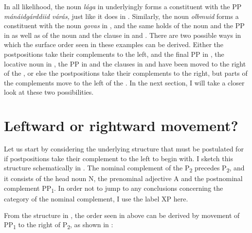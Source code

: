 \documentclass[output=paper]{LSP/langsci}
\begin{document}
In all likelihood, the noun \textit{lága} in  underlyingly forms a constituent with the PP \textit{mánáidgárddiid várás,} just like it does in . Similarly,\textit{} the noun \textit{olbmuid} forms a constituent with the noun \textit{govas} in , and the same holds of the noun and the PP in  as well as of the noun and the clause in  and . There are two possible ways in which the surface order seen in these examples can be derived. Either the postpositions take their complements to the left, and the final PP in , the locative noun in , the PP in  and the clauses in  and  have been moved to the right of the , or else the postpositions take their complements to the right, but parts of the complements move to the left of the . In the next section, I will take a closer look at these two possibilities.


\section{Leftward or rightward movement?} %

Let us start by considering the underlying structure that must be postulated for  if  postpositions take their complement to the left to begin with. I sketch this structure schematically in . The nominal complement of the  P\textsubscript{2} precedes P\textsubscript{2}, and it consists of the head noun N, the prenominal adjective A and the postnominal complement PP\textsubscript{1}. In order not to jump to any conclusions concerning the category of the nominal complement, I use the label XP here. 

\ea%
    \label{ex:julien:8}
   

\z
\z

From the structure in , the order seen in  above can be derived by movement of PP\textsubscript{1} to the right of P\textsubscript{2}, as shown in :
\end{document}
